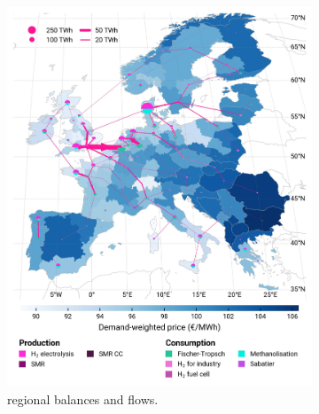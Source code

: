 \documentclass[preprint,12pt,sort&compress]{elsarticle}
\begin{document}
\begin{figure}[htbp]
  \centering
  \begin{subfigure}[t]{0.49\textwidth}
      \vspace{0pt}
      \includegraphics[width=1\textwidth]{maps/greenfield-pipelines/base_s_adm___2040-balance_map_H2}
      \vspace{-0.5cm}
      \caption{ regional balances and flows.}
      \label{fig:CP_lt_2040_h2}
  \end{subfigure}
  \hfill
  \begin{subfigure}[t]{0.49\textwidth}
      \vspace{0pt}

\end{subfigure}
\end{figure}
\end{document}
